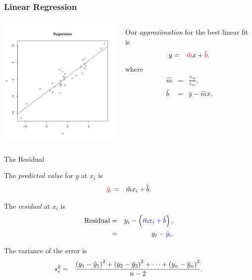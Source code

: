 \begin{frame}
  \frametitle{Linear Regression}

    \begin{columns}

      \centerline{\includegraphics[width=6cm]{img/regressionGeneral}}

      
      Our \textit{\color{red}approximation} for the best linear fit is
      \begin{eqnarray*}
        y & = & {\color{red}\hat{m}} x + {\color{red}\hat{b}}.
      \end{eqnarray*}
      where
      \begin{eqnarray*}
        \hat{m} & = & \frac{s_{xy}}{s_{xx}}, \\
        \hat{b} & = & \bar{y} - \hat{m} \bar{x}.
      \end{eqnarray*}

    \end{columns}

\end{frame}


\begin{frame}{The Residual}

  \begin{definition}
    The \textit{\color{red} predicted value} for $y$ at $x_i$ is
    \begin{eqnarray*}
      {\color{red}\hat{y}_i} & = & \hat{m} x_i + \hat{b}.
    \end{eqnarray*}

    The \textit{\color{red} residual} at $x_i$ is 
    \begin{eqnarray*}
      \mathrm{Residual} & = & y_i - \left( {\color{blue}\hat{m} x_i + \hat{b}} \right), \\
      & = & y_i - {\color{blue}\hat{y}_i}.
    \end{eqnarray*}

  \end{definition}

  {

    \begin{definition}
      The variance of the error is 
      \begin{eqnarray*}
        s^2_e & = & \frac{\left( y_1 - \hat{y}_1\right)^2 + \left( y_2 - \hat{y}_2\right)^2 + \cdots + \left( y_n - \hat{y}_n\right)^2 }{n-2}.
      \end{eqnarray*}
    \end{definition}

  }
  
\end{frame}

